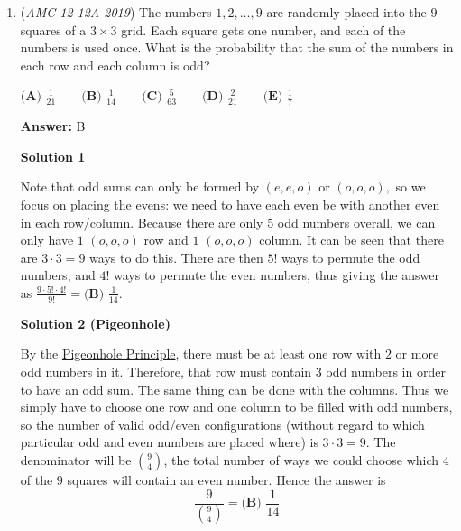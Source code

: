 \begin{enumerate}
 



\textbf{Solution 3}

Given that $\sqrt{\log{a}}$ and $\sqrt{\log{b}}$ are both integers, $a$ and $b$ must be in the form $10^{m^2}$ and $10^{n^2}$, respectively for some positive integers $m$ and $n$. Note that $\log \sqrt{a} = \frac{m^2}{2}$. By substituting for a and b, the equation becomes $m + n + \frac{m^2}{2} + \frac{n^2}{2} = 100$. After multiplying the equation by 2 and completing the square with respect to $m$ and $n$, the equation becomes $(m + 1)^2 + (n + 1)^2 = 202$. Testing squares of positive integers that add to $202$, $11^2 + 9^2$ is the only option. Without loss of generality, let $m = 10$ and $n = 8$. Plugging in $m$ and $n$ to solve for $a$ and $b$ gives us $a = 10^{100}$ and $b = 10^{64}$. Therefore, $ab = \boxed{\textbf{(D) } 10^{164}}$.

 


 


 


	\item (\textit{AMC 12 12A 2019}) The numbers $1,2,\dots,9$ are randomly placed into the $9$ squares of a $3 \times 3$ grid. Each square gets one number, and each of the numbers is used once. What is the probability that the sum of the numbers in each row and each column is odd?


 $\textbf{(A) }\frac{1}{21}\qquad\textbf{(B) }\frac{1}{14}\qquad\textbf{(C) }\frac{5}{63}\qquad\textbf{(D) }\frac{2}{21}\qquad\textbf{(E) } \frac17$

 \textbf{Answer: }B



\textbf{Solution 1}

Note that odd sums can only be formed by $(e,e,o)$ or $(o,o,o),$ so we focus on placing the evens: we need to have each even be with another even in each row/column. Because there are only $5$ odd numbers overall, we can only have $1$ $(o,o,o)$ row and $1$ $(o,o,o)$ column. It can be seen that there are $3 \cdot 3 = 9$ ways to do this. There  are then $5!$ ways to permute the odd numbers, and $4!$ ways to permute the even numbers, thus giving the answer as $\frac{9 \cdot 5! \cdot 4!}{9!}=\boxed{\textbf{(B) }\frac{1}{14}}$.

 



\textbf{Solution 2 (Pigeonhole)}

By the \href{https://artofproblemsolving.com/wiki/index.php/Pigeonhole\_Principle}{Pigeonhole Principle}, there must be at least one row with $2$ or more odd numbers in it. Therefore, that row must contain $3$ odd numbers in order to have an odd sum. The same thing can be done with the columns. Thus we simply have to choose one row and one column to be filled with odd numbers, so the number of valid odd/even configurations (without regard to which particular odd and even  numbers are placed where) is $3 \cdot 3 = 9$. The denominator will be $\binom{9}{4}$, the total number of ways we could choose which $4$ of the $9$ squares will contain an even number. Hence the answer is 
 \[\frac{9}{\binom{9}{4}}=\boxed{\textbf{(B) }\frac{1}{14}}\]


\end{enumerate}
